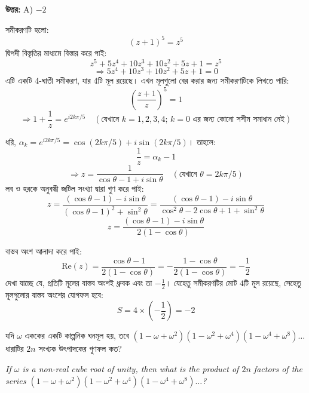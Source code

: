 \documentclass[12pt, a4paper]{article}
\begin{document}
\vspace{0.5em}
\begin{tcolorbox}[answerbox]
    \textbf{\color{success} উত্তর:} A) $-2$
\end{tcolorbox}
\vspace{1em}

\begin{tcolorbox}[solutionbox={সমাধান (Solution)}]
    \noindent
    সমীকরণটি হলো:
    \[ (z + 1)^5 = z^5 \]
    দ্বিপদী বিস্তৃতির মাধ্যমে বিস্তার করে পাই:
    \[ z^5 + 5z^4 + 10z^3 + 10z^2 + 5z + 1 = z^5 \]
    \[ \Rightarrow 5z^4 + 10z^3 + 10z^2 + 5z + 1 = 0 \]
    এটি একটি $4$-ঘাতী সমীকরণ, যার $4$টি মূল রয়েছে। এখন মূলগুলো বের করার জন্য সমীকরণটিকে লিখতে পারি:
    \[ \left(\frac{z + 1}{z}\right)^5 = 1 \]
    \[ \Rightarrow 1 + \frac{1}{z} = e^{i 2k\pi/5} \quad (\text{যেখানে } k = 1, 2, 3, 4; \, k=0 \text{ এর জন্য কোনো সসীম সমাধান নেই}) \]
    
    \vspace{0.5em}
    ধরি, $\alpha_k = e^{i 2k\pi/5} = \cos(2k\pi/5) + i\sin(2k\pi/5)$। তাহলে:
    \[ \frac{1}{z} = \alpha_k - 1 \]
    \[ \Rightarrow z = \frac{1}{\cos\theta - 1 + i\sin\theta} \quad (\text{যেখানে } \theta = 2k\pi/5) \]
    লব ও হরকে অনুবন্ধী জটিল সংখ্যা দ্বারা গুণ করে পাই:
    \[ z = \frac{(\cos\theta - 1) - i\sin\theta}{(\cos\theta - 1)^2 + \sin^2\theta} = \frac{(\cos\theta - 1) - i\sin\theta}{\cos^2\theta - 2\cos\theta + 1 + \sin^2\theta} \]
    \[ z = \frac{(\cos\theta - 1) - i\sin\theta}{2(1 - \cos\theta)} \]
    
    \vspace{0.5em}
    বাস্তব অংশ আলাদা করে পাই:
    \[ \text{Re}(z) = \frac{\cos\theta - 1}{2(1 - \cos\theta)} = -\frac{1 - \cos\theta}{2(1 - \cos\theta)} = -\frac{1}{2} \]
    দেখা যাচ্ছে যে, প্রতিটি মূলের বাস্তব অংশই ধ্রুবক এবং তা $-\frac{1}{2}$। যেহেতু সমীকরণটির মোট $4$টি মূল রয়েছে, সেহেতু মূলগুলোর বাস্তব অংশের যোগফল হবে:
    \[ S = 4 \times \left(-\frac{1}{2}\right) = -2 \]
\end{tcolorbox}
\begin{tcolorbox}[questionbox={প্রশ্ন (Question) 18}]
    \noindent
    যদি $\omega$ এককের একটি কাল্পনিক ঘনমূল হয়, তবে $(1 - \omega + \omega^2)(1 - \omega^2 + \omega^4)(1 - \omega^4 + \omega^8)\dots$ ধারাটির $2n$ সংখ্যক উৎপাদকের গুণফল কত?
    
    \vspace{0.8em}
    \begin{english}
    \noindent\textit{\color{darkgray}
    If $\omega$ is a non-real cube root of unity, then what is the product of $2n$ factors of the series $(1 - \omega + \omega^2)(1 - \omega^2 + \omega^4)(1 - \omega^4 + \omega^8)\dots$?
    }
    \end{english}
\end{tcolorbox}
\end{document}
